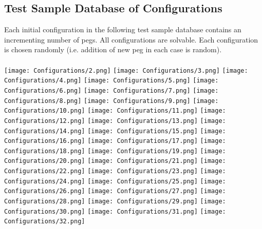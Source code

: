 \documentclass{article}
\begin{document}
\subsection{Test Sample Database of Configurations}
Each initial configuration in the following test sample database contains an incrementing number of pegs. All configurations are solvable. Each configuration is chosen randomly (i.e. addition of new peg in each case is random).\\\\
\texttt{[image: Configurations/2.png]}
\texttt{[image: Configurations/3.png]}
\texttt{[image: Configurations/4.png]}
\texttt{[image: Configurations/5.png]}
\texttt{[image: Configurations/6.png]}
\texttt{[image: Configurations/7.png]}
\texttt{[image: Configurations/8.png]}
\texttt{[image: Configurations/9.png]}
\texttt{[image: Configurations/10.png]}
\texttt{[image: Configurations/11.png]}
\texttt{[image: Configurations/12.png]}
\texttt{[image: Configurations/13.png]}
\texttt{[image: Configurations/14.png]}
\texttt{[image: Configurations/15.png]}
\texttt{[image: Configurations/16.png]}
\texttt{[image: Configurations/17.png]}
\texttt{[image: Configurations/18.png]}
\texttt{[image: Configurations/19.png]}
\texttt{[image: Configurations/20.png]}
\texttt{[image: Configurations/21.png]}
\texttt{[image: Configurations/22.png]}
\texttt{[image: Configurations/23.png]}
\texttt{[image: Configurations/24.png]}
\texttt{[image: Configurations/25.png]}
\texttt{[image: Configurations/26.png]}
\texttt{[image: Configurations/27.png]}
\texttt{[image: Configurations/28.png]}
\texttt{[image: Configurations/29.png]}
\texttt{[image: Configurations/30.png]}
\texttt{[image: Configurations/31.png]}
\texttt{[image: Configurations/32.png]}
\end{document}
